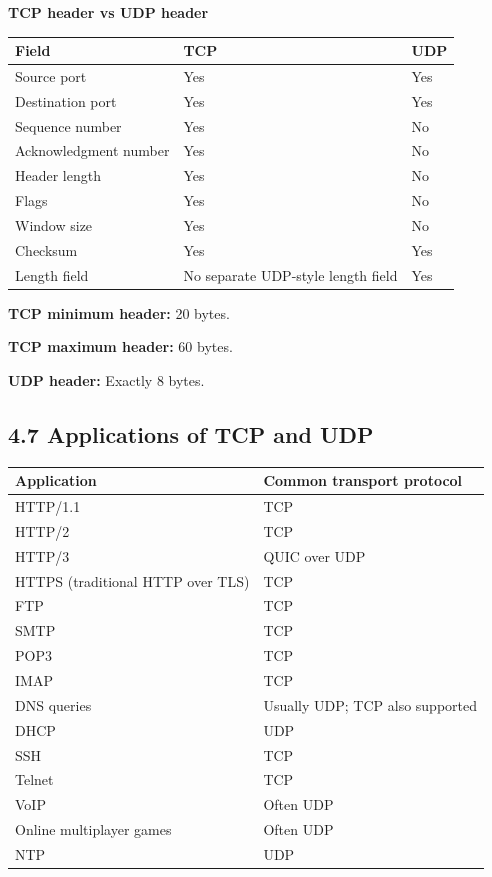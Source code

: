 \textbf{TCP header vs UDP header}

\begin{table}[htbp]
\centering
\begin{tabularx}{\textwidth}{p{4.2cm} X X}
\toprule
\textbf{Field} & \textbf{TCP} & \textbf{UDP} \\
\midrule
Source port & Yes & Yes \\
Destination port & Yes & Yes \\
Sequence number & Yes & No \\
Acknowledgment number & Yes & No \\
Header length & Yes & No \\
Flags & Yes & No \\
Window size & Yes & No \\
Checksum & Yes & Yes \\
Length field & No separate UDP-style length field & Yes \\
\bottomrule
\end{tabularx}
\end{table}

\textbf{TCP minimum header:} 20 bytes.

\textbf{TCP maximum header:} 60 bytes.

\textbf{UDP header:} Exactly 8 bytes.

\subsection{4.7 Applications of TCP and UDP}

\begin{table}[htbp]
\centering
\begin{tabularx}{\textwidth}{X X}
\toprule
\textbf{Application} & \textbf{Common transport protocol} \\
\midrule
HTTP/1.1 & TCP \\
HTTP/2 & TCP \\
HTTP/3 & QUIC over UDP \\
HTTPS (traditional HTTP over TLS) & TCP \\
FTP & TCP \\
SMTP & TCP \\
POP3 & TCP \\
IMAP & TCP \\
DNS queries & Usually UDP; TCP also supported \\
DHCP & UDP \\
SSH & TCP \\
Telnet & TCP \\
VoIP & Often UDP \\
Online multiplayer games & Often UDP \\
NTP & UDP \\
\bottomrule
\end{tabularx}
\end{table}

